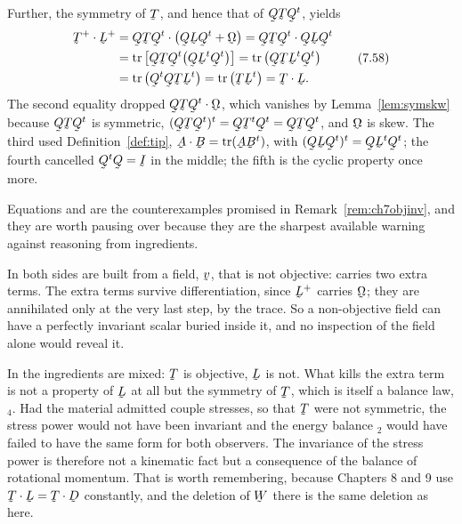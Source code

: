 Further, the symmetry of $\bT$, and hence that of $\bQ\bT\bQ^{t}$, yields
\begin{equation}
\begin{aligned}
   \bT^{+}\cdot\bL^{+}
   &=\bQ\bT\bQ^{t}\cdot\big(\bQ\bL\bQ^{t}+\bOm\big)
    =\bQ\bT\bQ^{t}\cdot\bQ\bL\bQ^{t}\\
   &=\tr\big[\bQ\bT\bQ^{t}\big(\bQ\bL^{t}\bQ^{t}\big)\big]
    =\tr\big(\bQ\bT\bL^{t}\bQ^{t}\big)\\
   &=\tr\big(\bQ^{t}\bQ\bT\bL^{t}\big)=\tr\big(\bT\bL^{t}\big)
    =\bT\cdot\bL .
\end{aligned}
   \tag{7.58}\label{eq:7.58}
\end{equation}
The second equality dropped $\bQ\bT\bQ^{t}\cdot\bOm$, which vanishes by
Lemma~\ref{lem:symskw} because $\bQ\bT\bQ^{t}$ is symmetric,
$(\bQ\bT\bQ^{t})^{t}=\bQ\bT^{t}\bQ^{t}=\bQ\bT\bQ^{t}$, and $\bOm$ is
skew. The third used Definition~\ref{def:tip},
$\bA\cdot\bB=\tr(\bA\bB^{t})$, with
$(\bQ\bL\bQ^{t})^{t}=\bQ\bL^{t}\bQ^{t}$; the fourth cancelled
$\bQ^{t}\bQ=\I$ in the middle; the fifth is the cyclic property once
more.

\begin{remark}\label{rem:ch7twoscalars}
Equations  and  are the counterexamples promised in
Remark~\ref{rem:ch7objinv}, and they are worth pausing over because they
are the sharpest available warning against reasoning from ingredients.

In  both sides are built from a field, $\bv$, that is not
objective:  carries two extra terms. The extra terms survive
differentiation, since $\bL^{+}$ carries $\bOm$; they are annihilated
only at the very last step, by the trace. So a non-objective field can
have a perfectly invariant scalar buried inside it, and no inspection of
the field alone would reveal it.

In  the ingredients are mixed: $\bT$ is objective, $\bL$ is
not. What kills the extra term is not a property of $\bL$ at all but the
symmetry of $\bT$, which is itself a balance law, $_{4}$. Had
the material admitted couple stresses, so that $\bT$ were not symmetric,
the stress power would not have been invariant and the energy balance
$_{2}$ would have failed to have the same form for both
observers. The invariance of the stress power is therefore not a
kinematic fact but a consequence of the balance of rotational momentum.
That is worth remembering, because Chapters 8 and 9 use
$\bT\cdot\bL=\bT\cdot\bD$ constantly, and the deletion of $\bW$ there is
the same deletion as here.
\end{remark}

